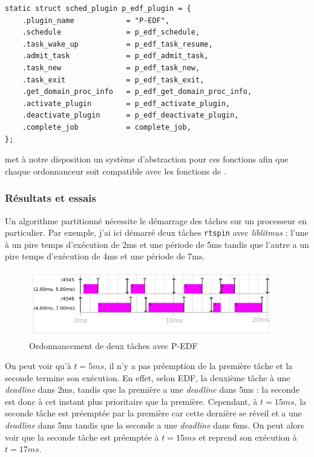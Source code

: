 \begin{lstlisting}[style=cstyle, caption={Déclaration des fonctions de l'ordonnanceur}, label={lst:decl-func-sched}]
static struct sched_plugin p_edf_plugin = {
    .plugin_name            = "P-EDF",
    .schedule               = p_edf_schedule,
    .task_wake_up           = p_edf_task_resume,
    .admit_task             = p_edf_admit_task,
    .task_new               = p_edf_task_new,
    .task_exit              = p_edf_task_exit,
    .get_domain_proc_info   = p_edf_get_domain_proc_info,
    .activate_plugin        = p_edf_activate_plugin,
    .deactivate_plugin      = p_edf_deactivate_plugin,
    .complete_job           = complete_job,
};
\end{lstlisting}

\litmus met à notre disposition un système d'abstraction pour ces fonctions afin que chaque ordonnanceur soit compatible avec les fonctions de \litmus.


\subsubsection{Résultats et essais}

Un algorithme partitionné nécessite le démarrage des tâches sur un processeur en particulier. Par exemple, j'ai ici démarré deux tâches \texttt{rtspin} avec \textit{liblitmus} : l'une à un pire temps d'exécution de 2ms et une période de 5ms tandis que l'autre a un pire temps d'exécution de 4ms et une période de 7ms.

\begin{figure}[H]
    \centering
    \includegraphics[width=0.95\textwidth]{Images/P-EDF-SCHEDUALIBILITY-DEMO.png}
    \caption{Ordonnancement de deux tâches avec P-EDF}
    \label{fig:edf-schedualibility-demo}
\end{figure}

On peut voir qu'à $t=5ms$, il n'y a pas préemption de la première tâche et la seconde termine son exécution. En effet, selon EDF, la deuxième tâche à une \textit{deadline} dans 2ms, tandis que la première a une \textit{deadline} dans 5ms : la seconde est donc à cet instant plus prioritaire que la première. Cependant, à $t=15ms$, la seconde tâche est préemptée par la première car cette dernière se réveil et a une \textit{deadline} dans 5ms tandis que la seconde a une \textit{deadline} dans 6ms. On peut alors voir que la seconde tâche est préemptée à $t=15ms$ et reprend son exécution à $t=17ms$. 
